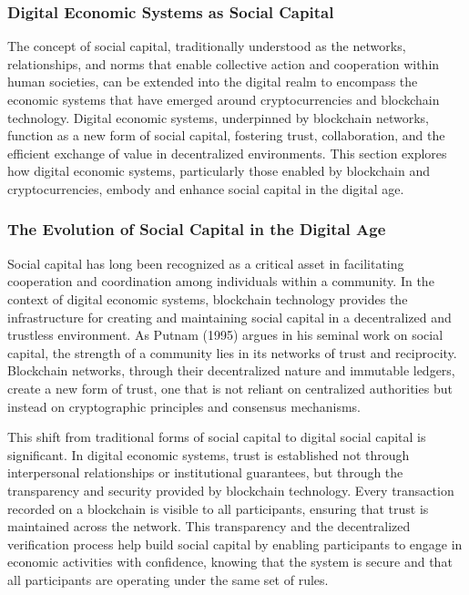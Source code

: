 \documentclass[12pt,twoside]{article}
\begin{document}
\subsubsection{Digital Economic Systems as Social Capital}

The concept of social capital, traditionally understood as the networks, relationships, and norms that enable collective action and cooperation within human societies, can be extended into the digital realm to encompass the economic systems that have emerged around cryptocurrencies and blockchain technology. Digital economic systems, underpinned by blockchain networks, function as a new form of social capital, fostering trust, collaboration, and the efficient exchange of value in decentralized environments. This section explores how digital economic systems, particularly those enabled by blockchain and cryptocurrencies, embody and enhance social capital in the digital age.

\subsubsection{The Evolution of Social Capital in the Digital Age}

Social capital has long been recognized as a critical asset in facilitating cooperation and coordination among individuals within a community. In the context of digital economic systems, blockchain technology provides the infrastructure for creating and maintaining social capital in a decentralized and trustless environment. As Putnam (1995) argues in his seminal work on social capital, the strength of a community lies in its networks of trust and reciprocity. Blockchain networks, through their decentralized nature and immutable ledgers, create a new form of trust, one that is not reliant on centralized authorities but instead on cryptographic principles and consensus mechanisms.

This shift from traditional forms of social capital to digital social capital is significant. In digital economic systems, trust is established not through interpersonal relationships or institutional guarantees, but through the transparency and security provided by blockchain technology. Every transaction recorded on a blockchain is visible to all participants, ensuring that trust is maintained across the network. This transparency and the decentralized verification process help build social capital by enabling participants to engage in economic activities with confidence, knowing that the system is secure and that all participants are operating under the same set of rules.
\end{document}
